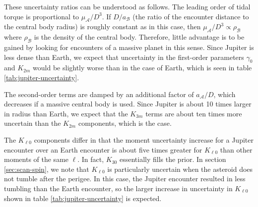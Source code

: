 \documentclass[fleqn,usenatbib]{mnras}
\begin{document}
These uncertainty ratios can be understood as follows. The leading order of tidal torque is proportional to $\mu_\mathcal{A} / D^3$. If $D/a_\mathcal{B}$ (the ratio of the encounter distance to the central body radius) is roughly constant as in this case, then $\mu_\mathcal{A} / D^3 \propto \rho_\mathcal{B}$ where $\rho_\mathcal{B}$ is the density of the central body. Therefore, little advantage is to be gained by looking for encounters of a massive planet in this sense. Since Jupiter is less dense than Earth, we expect that uncertainty in the first-order parameters $\gamma_0$ and $K_{2m}$ would be slightly worse than in the case of Earth, which is seen in table \ref{tab:jupiter-uncertainty}.

The second-order terms are damped by an additional factor of $a_\mathcal{A}/D$, which decreases if a massive central body is used. Since Jupiter is about 10 times larger in radius than Earth, we expect that the $K_{3m}$ terms are about ten times more uncertain than the $K_{2m}$ components, which is the case.

The $K_{\ell 0}$ components differ in that the moment uncertainty increase for a Jupiter encounter over an Earth encounter is about five times greater for $K_{\ell 0}$ than other moments of the same $\ell$. In fact, $K_{30}$ essentially fills the prior. In section \ref{sec:scan-spin}, we note that $K_{\ell 0}$ is particularly uncertain when the asteroid does not tumble after the perigee. In this case, the Jupiter encounter resulted in less tumbling than the Earth encounter, so the larger increase in uncertainty in $K_{\ell 0}$ shown in table \ref{tab:jupiter-uncertainty} is expected.
\end{document}
